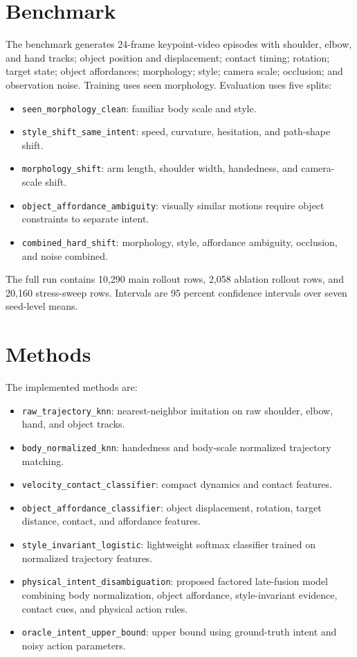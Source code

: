 \documentclass{article}
\begin{document}
\section{Benchmark}
The benchmark generates 24-frame keypoint-video episodes with shoulder, elbow, and hand tracks; object position and displacement; contact timing; rotation; target state; object affordances; morphology; style; camera scale; occlusion; and observation noise. Training uses seen morphology. Evaluation uses five splits:
\begin{itemize}
\item \texttt{seen\_morphology\_clean}: familiar body scale and style.
\item \texttt{style\_shift\_same\_intent}: speed, curvature, hesitation, and path-shape shift.
\item \texttt{morphology\_shift}: arm length, shoulder width, handedness, and camera-scale shift.
\item \texttt{object\_affordance\_ambiguity}: visually similar motions require object constraints to separate intent.
\item \texttt{combined\_hard\_shift}: morphology, style, affordance ambiguity, occlusion, and noise combined.
\end{itemize}
The full run contains 10,290 main rollout rows, 2,058 ablation rollout rows, and 20,160 stress-sweep rows. Intervals are 95 percent confidence intervals over seven seed-level means.

\section{Methods}
The implemented methods are:
\begin{itemize}
\item \texttt{raw\_trajectory\_knn}: nearest-neighbor imitation on raw shoulder, elbow, hand, and object tracks.
\item \texttt{body\_normalized\_knn}: handedness and body-scale normalized trajectory matching.
\item \texttt{velocity\_contact\_classifier}: compact dynamics and contact features.
\item \texttt{object\_affordance\_classifier}: object displacement, rotation, target distance, contact, and affordance features.
\item \texttt{style\_invariant\_logistic}: lightweight softmax classifier trained on normalized trajectory features.
\item \texttt{physical\_intent\_disambiguation}: proposed factored late-fusion model combining body normalization, object affordance, style-invariant evidence, contact cues, and physical action rules.
\item \texttt{oracle\_intent\_upper\_bound}: upper bound using ground-truth intent and noisy action parameters.
\end{itemize}
\end{document}
